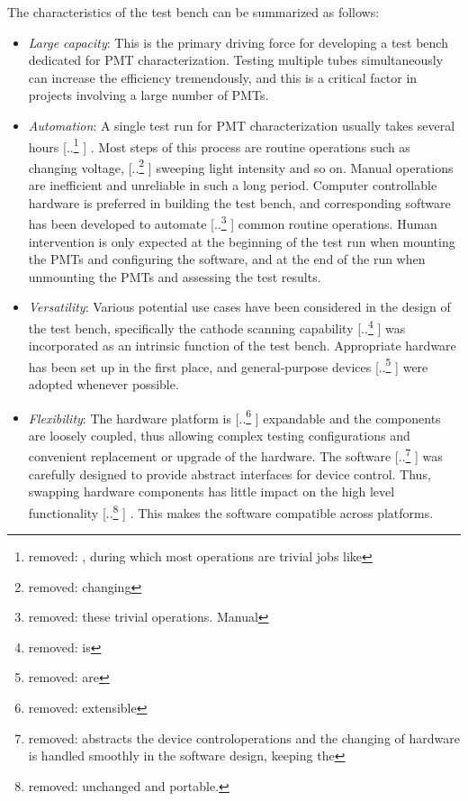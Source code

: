 \documentclass{nst}
\providecommand{\DIFadd}[1]{{\protect\color{blue} \sf #1}} %
\providecommand{\DIFdel}[1]{{\protect\color{red} [..\footnote{removed: #1} ]}} %
\providecommand{\DIFaddbegin}{} %
\providecommand{\DIFaddend}{} %
\providecommand{\DIFdelbegin}{} %
\providecommand{\DIFdelend}{} %
\begin{document}
The characteristics of the test bench can be summarized as follows:
\begin{itemize}
	\item \textit{Large capacity}: This is the primary driving force for developing a test bench dedicated for PMT characterization.
	Testing multiple tubes simultaneously can increase the efficiency tremendously, and this is a critical factor in projects involving \DIFaddbegin \DIFadd{a }\DIFaddend large number of PMTs. 
	\item \textit{Automation}: A single test run for PMT characterization usually takes several hours\DIFdelbegin \DIFdel{, during which most operations are trivial jobs like }\DIFdelend \DIFaddbegin \DIFadd{. Most steps of this process are routine operations such as }\DIFaddend changing voltage, \DIFdelbegin \DIFdel{changing }\DIFdelend \DIFaddbegin \DIFadd{sweeping }\DIFaddend light intensity and so on.
	Manual operations are inefficient and unreliable in such a long period.
	Computer controllable hardware is preferred in building the test bench, and corresponding software has been developed to automate \DIFdelbegin \DIFdel{these trivial operations.
	Manual }\DIFdelend \DIFaddbegin \DIFadd{common routine operations.
	Human }\DIFaddend intervention is only expected at the beginning of the test run when mounting the PMTs and configuring the software, and at the end of the run when unmounting the PMTs and assessing the test results.
	\item \textit{Versatility}: Various potential use cases have been considered in the design of the test bench, specifically the cathode scanning capability \DIFdelbegin \DIFdel{is }\DIFdelend \DIFaddbegin \DIFadd{was }\DIFaddend incorporated as an intrinsic function of the test bench.
	Appropriate hardware has been set up in the first place, and general-purpose devices \DIFdelbegin \DIFdel{are }\DIFdelend \DIFaddbegin \DIFadd{were }\DIFaddend adopted whenever possible.
	\item \textit{Flexibility}: %
	The hardware platform is \DIFdelbegin \DIFdel{extensible }\DIFdelend \DIFaddbegin \DIFadd{expandable }\DIFaddend and the components are loosely coupled, thus allowing complex testing configurations and convenient replacement or upgrade of the hardware.
	The software \DIFdelbegin \DIFdel{abstracts the device controloperations and the changing of hardware is handled smoothly in the software design, keeping the }\DIFdelend \DIFaddbegin \DIFadd{was carefully designed to provide abstract interfaces for device control. Thus, swapping hardware components has little impact on the }\DIFaddend high level functionality\DIFdelbegin \DIFdel{unchanged and portable. }\DIFdelend \DIFaddbegin \DIFadd{. This makes the software compatible across platforms.
}\DIFaddend \end{itemize}
\end{document}
